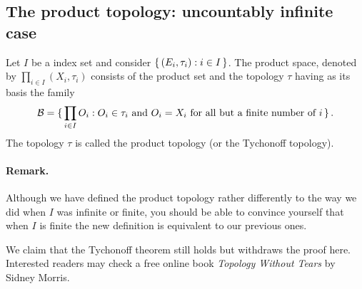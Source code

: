 \newpage

\subsection{The product topology: uncountably infinite case}


Let $I$ be a index set and consider 
$ \set{(E_i, \tau_i) : i \in I}$.
The product space, denoted by $\prod_{i \in I} (X_i, \tau_i)$ consists of the product set and the topology $\tau$ having as its basis the family
$$
\mathcal B = \set{ \prod_{i \in I} O_i: O_i \in \tau_i \text{ and } O_i = X_i \text{ for all but a finite number of } i}.
$$
The topology $\tau$ is called the product topology (or the Tychonoff topology).


\paragraph{Remark.} Although we have defined the product topology
rather differently to the way we did when $I$ was 
infinite or finite,
you should be able to convince
yourself that when $I$ is finite the new definition is equivalent to
our previous ones.


We claim that the Tychonoff theorem still holds but withdraws the proof here.
Interested readers may check a free online book
\textit{Topology Without Tears} by Sidney Morris.

